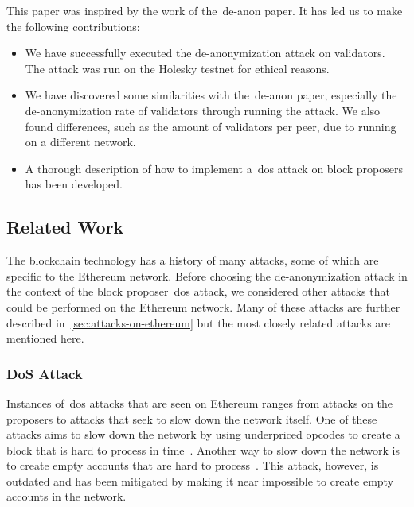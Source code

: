 This paper was inspired by the work of the~\gls{de-anon paper}.
It has led us to make the following contributions:
\begin{itemize}
    \item We have successfully executed the de-anonymization attack on validators.
    The attack was run on the Holesky testnet for ethical reasons.
    \item We have discovered some similarities with the~\gls{de-anon paper}, especially the de-anonymization rate of validators through running the attack.
    We also found differences, such as the amount of validators per peer, due to running on a different network.
    \item A thorough description of how to implement a~\gls{dos} attack on block proposers has been developed.
\end{itemize}

\subsection{Related Work}\label{subsec:related-work}
The blockchain technology has a history of many attacks, some of which are specific to the Ethereum network.
Before choosing the de-anonymization attack in the context of the block proposer~\gls{dos} attack, we considered other attacks that could be performed on the Ethereum network.
Many of these attacks are further described in~\autoref{sec:attacks-on-ethereum} but the most closely related attacks are mentioned here.


\subsubsection{DoS Attack}\label{subsubsec:dos-attack}
Instances of~\gls{dos} attacks that are seen on Ethereum ranges from attacks on the proposers to attacks that seek to slow down the network itself.
One of these attacks aims to slow down the network by using underpriced opcodes to create a block that is hard to process in time~\cite{10.1145/3391195,9815256}.
Another way to slow down the network is to create empty accounts that are hard to process~\cite{empty-account-mitigation,empty-account-eip-mitigation}.
This attack, however, is outdated and has been mitigated by making it near impossible to create empty accounts in the network.

